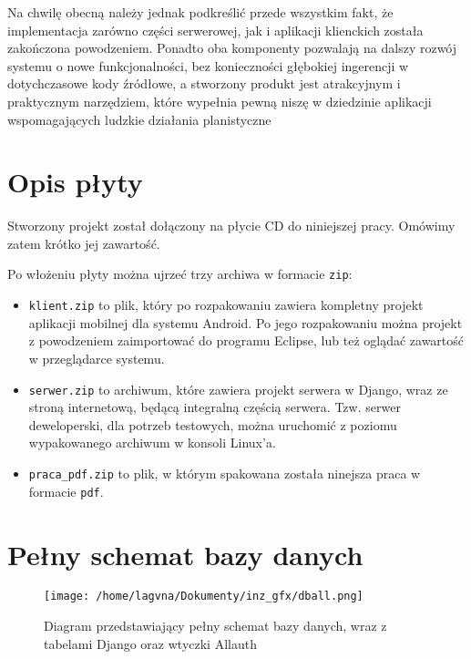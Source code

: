 \documentclass[12pt,titlepage]{article}
\begin{document}
Na chwilę obecną należy jednak podkreślić przede wszystkim fakt, że implementacja zarówno części serwerowej, jak i aplikacji klienckich została zakończona powodzeniem. 
Ponadto oba komponenty pozwalają na dalszy rozwój systemu o nowe funkcjonalności, bez konieczności głębokiej ingerencji w dotychczasowe kody źródłowe, a stworzony produkt
jest atrakcyjnym i praktycznym narzędziem, które wypełnia pewną niszę w dziedzinie aplikacji wspomagających ludzkie działania planistyczne
\newpage


\newpage
\begin{appendices}
\section{Opis płyty}
\label{sec:cd}
Stworzony projekt został dołączony na płycie CD do niniejszej pracy. Omówimy zatem krótko jej zawartość.

Po włożeniu płyty można ujrzeć trzy archiwa w formacie \verb|zip|:
\begin{itemize}
 \item \verb|klient.zip| to plik, który po rozpakowaniu zawiera kompletny projekt aplikacji mobilnej dla systemu Android. Po jego rozpakowaniu można projekt z powodzeniem zaimportować
 do programu Eclipse, lub też oglądać zawartość w przeglądarce systemu.
 \item \verb|serwer.zip| to archiwum, które zawiera projekt serwera w Django, wraz ze stroną internetową, będącą integralną częścią serwera. Tzw. serwer deweloperski, dla potrzeb testowych, można uruchomić
 z poziomu wypakowanego archiwum w konsoli Linux'a.
 \item \verb|praca_pdf.zip| to plik, w którym spakowana została ninejsza praca w formacie \verb|pdf|.
\end{itemize}

\newpage
 \section{Pełny schemat bazy danych}
 \label{sec:dball}
 \begin{figure}[htb]
\begin{center}
 \texttt{[image: /home/lagvna/Dokumenty/inz\_gfx/dball.png]}
 \caption{Diagram przedstawiający pełny schemat bazy danych, wraz z tabelami Django oraz wtyczki Allauth}
 \label{fig:db}
 \end{center}
\end{figure}

\end{appendices}
\end{document}
